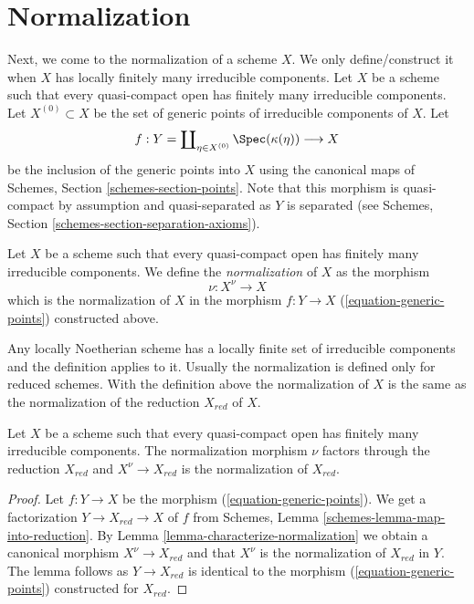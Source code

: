 \section{Normalization}
\label{section-normalization}

\noindent
Next, we come to the normalization of a scheme $X$.
We only define/construct it when $X$ has locally finitely many irreducible
components. Let $X$ be a scheme such that every quasi-compact open has
finitely many irreducible components. Let
$X^{(0)} \subset X$ be the set of generic points of irreducible components
of $X$. Let
\begin{equation}
\label{equation-generic-points}
f :
Y = \coprod\nolimits_{\eta \in X^{(0)}} \Spec(\kappa(\eta))
\longrightarrow
X
\end{equation}
be the inclusion of the generic points into $X$ using the
canonical maps of Schemes, Section \ref{schemes-section-points}.
Note that this morphism is quasi-compact by assumption and
quasi-separated as $Y$ is separated (see
Schemes, Section \ref{schemes-section-separation-axioms}).

\begin{definition}
\label{definition-normalization}
Let $X$ be a scheme such that every quasi-compact open has
finitely many irreducible components. We define the
{\it normalization} of $X$ as the morphism
$$
\nu : X^\nu \longrightarrow X
$$
which is the normalization of $X$ in the morphism $f : Y \to X$
(\ref{equation-generic-points}) constructed above.
\end{definition}

\noindent
Any locally Noetherian scheme has a locally finite set of irreducible
components and the definition applies to it.
Usually the normalization is defined only for reduced schemes.
With the definition above the normalization of $X$ is the same
as the normalization of the reduction $X_{red}$ of $X$.

\begin{lemma}
\label{lemma-normalization-reduced}
Let $X$ be a scheme such that every quasi-compact open has
finitely many irreducible components. The normalization morphism
$\nu$ factors through the reduction $X_{red}$ and $X^\nu \to X_{red}$
is the normalization of $X_{red}$.
\end{lemma}

\begin{proof}
Let $f : Y \to X$ be the morphism (\ref{equation-generic-points}).
We get a factorization $Y \to X_{red} \to X$ of $f$ from
Schemes, Lemma \ref{schemes-lemma-map-into-reduction}.
By Lemma \ref{lemma-characterize-normalization} we obtain a canonical
morphism $X^\nu \to X_{red}$
and that $X^\nu$ is the normalization of $X_{red}$ in $Y$.
The lemma follows as $Y \to X_{red}$ is identical to the morphism
(\ref{equation-generic-points}) constructed for $X_{red}$.
\end{proof}

